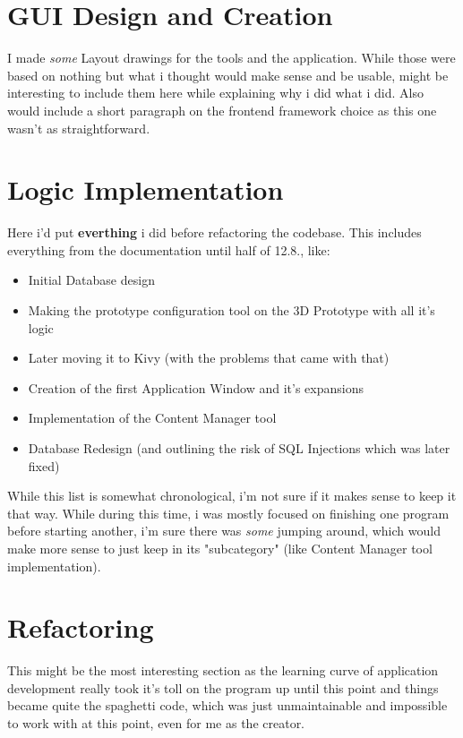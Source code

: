 \section{GUI Design and Creation}
I made \textit{some} Layout drawings for the tools and the application. While those were based on nothing but what i thought would make sense and be usable, might be interesting to include them here while explaining why i did what i did.
Also would include a short paragraph on the frontend framework choice as this one wasn't as straightforward.

\section{Logic Implementation}
Here i'd put \textbf{everthing} i did before refactoring the codebase. This includes everything from the documentation until half of 12.8., like:
\begin{itemize}
	\item Initial Database design
	\item Making the prototype configuration tool on the 3D Prototype with all it's logic 
	\item Later moving it to Kivy (with the problems that came with that)
	\item Creation of the first Application Window and it's expansions
	\item Implementation of the Content Manager tool
	\item Database Redesign (and outlining the risk of SQL Injections which was later fixed)
\end{itemize}

While this list is somewhat chronological, i'm not sure if it makes sense to keep it that way. While during this time, i was mostly focused on finishing one program before starting another, i'm sure there was \textit{some} jumping around, which would make more sense to just keep in its "subcategory" (like Content Manager tool implementation).

\section{Refactoring}

This might be the most interesting section as the learning curve of application development really took it's toll on the program up until this point and things became quite the spaghetti code, which was just unmaintainable and impossible to work with at this point, even for me as the creator.

